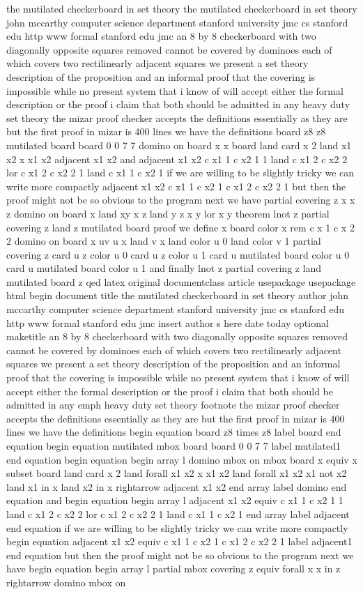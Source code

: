 the mutilated checkerboard in set theory the mutilated checkerboard in set theory john mccarthy computer science department stanford university jmc cs stanford edu http www formal stanford edu jmc an 8 by 8 checkerboard with two diagonally opposite squares removed cannot be covered by dominoes each of which covers two rectilinearly adjacent squares we present a set theory description of the proposition and an informal proof that the covering is impossible while no present system that i know of will accept either the formal description or the proof i claim that both should be admitted in any heavy duty set theory the mizar proof checker accepts the definitions essentially as they are but the first proof in mizar is 400 lines we have the definitions board z8 z8 mutilated board board 0 0 7 7 domino on board x x board land card x 2 land x1 x2 x x1 x2 adjacent x1 x2 and adjacent x1 x2 c x1 1 c x2 1 1 land c x1 2 c x2 2 lor c x1 2 c x2 2 1 land c x1 1 c x2 1 if we are willing to be slightly tricky we can write more compactly adjacent x1 x2 c x1 1 c x2 1 c x1 2 c x2 2 1 but then the proof might not be so obvious to the program next we have partial covering z x x z domino on board x land xy x z land y z x y lor x y theorem lnot z partial covering z land z mutilated board proof we define x board color x rem c x 1 c x 2 2 domino on board x uv u x land v x land color u 0 land color v 1 partial covering z card u z color u 0 card u z color u 1 card u mutilated board color u 0  card u mutilated board color u 1 and finally lnot z partial covering z land mutilated board z qed latex original documentclass article usepackage usepackage html begin document title the mutilated checkerboard in set theory author john mccarthy computer science department stanford university jmc cs stanford edu http www formal stanford edu jmc insert author s here date today optional maketitle an 8 by 8 checkerboard with two diagonally opposite squares removed cannot be covered by dominoes each of which covers two rectilinearly adjacent squares we present a set theory description of the proposition and an informal proof that the covering is impossible while no present system that i know of will accept either the formal description or the proof i claim that both should be admitted in any emph heavy duty set theory footnote the mizar proof checker accepts the definitions essentially as they are but the first proof in mizar is 400 lines we have the definitions begin equation board z8 times z8 label board end equation begin equation mutilated mbox board board 0 0 7 7 label mutilated1 end equation begin equation begin array l domino mbox on mbox board x equiv x subset board land card x 2 land forall x1 x2 x x1 x2 land forall x1 x2 x1 not x2 land x1 in x land x2 in x rightarrow adjacent x1 x2 end array label domino end equation and begin equation begin array l adjacent x1 x2 equiv c x1 1 c x2 1 1 land c x1 2 c x2 2 lor c x1 2 c x2 2 1 land c x1 1 c x2 1 end array label adjacent end equation if we are willing to be slightly tricky we can write more compactly begin equation adjacent x1 x2 equiv c x1 1 c x2 1 c x1 2 c x2 2 1 label adjacent1 end equation but then the proof might not be so obvious to the program next we have begin equation begin array l partial mbox covering z equiv forall x x in z rightarrow domino mbox on 
